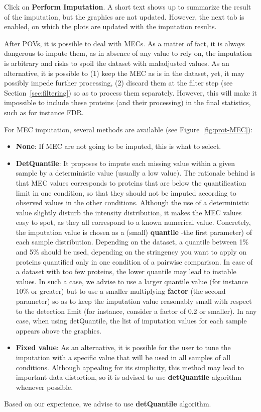 \documentclass[12pt]{article}
\begin{document}
Click on \textbf{Perform Imputation}. A short text shows up to summarize the result of the imputation, but the graphics are not updated.
However, the next tab is enabled, on which the plots are updated with the imputation results.

After POVs, it is possible to deal with MECs. As a matter of fact, it is always dangerous to impute them, as in absence of any value to rely on, the imputation is arbitrary and risks to spoil the dataset with maladjusted values. As an alternative, it is possible to (1) keep the MEC as is in the dataset, yet, it may possibly impede further processing, (2) discard them at the filter step (see Section~\ref{sec:filtering}) so as to process them separately. However, this will make it impossible to include these proteins (and their processing) in the final statistics, such as for instance FDR. 

For MEC imputation, several methods are available (see Figure~\ref{fig:prot-MEC}):
\begin{itemize}
	\item \textbf{None}: If MEC are not going to be imputed, this is what to select.
	\item \textbf{DetQuantile}: It proposes to impute each missing value within a given sample by a deterministic value (usually a low value). The rationale behind is that MEC values corresponds to proteins that are below the quantification limit in one condition, so that they should not be imputed according to observed values in the other conditions. Although the use of a deterministic value slightly disturb the intensity distribution, it makes the MEC values easy to spot, as they all correspond to a known numerical value. Concretely, the imputation value is chosen as a (small) \textbf{quantile} -the first parameter) of each sample distribution. Depending on the dataset, a quantile between 1\% and 5\% should be used, depending on the stringency you want to apply on proteins quantified only in one condition of a pairwise comparison. In case of a dataset with too few proteins, the lower quantile may lead to instable values. In such a case, we advise to use a larger quantile value (for instance 10\% or greater) but to use a smaller multiplying \textbf{factor} (the second parameter) so as to keep the imputation value reasonably small with respect to the detection limit (for instance, consider a factor of 0.2 or smaller). In any case, when using detQuantile, the list of imputation values for each sample appears above the graphics.
	\item \textbf{Fixed value}: As an alternative, it is possible for the user to tune the imputation with a specific value that will be used in all samples of all conditions. Although appealing for its simplicity, this method may lead to important data distortion, so it is advised to use \textbf{detQuantile} algorithm whenever possible.
\end{itemize}
Based on our experience, we advise to use \textbf{detQuantile} algorithm.
\end{document}
